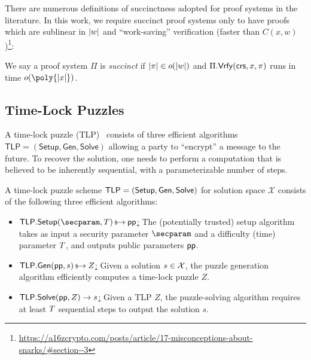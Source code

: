 There are numerous definitions of succinctness adopted for proof systems in the literature. In this work, we require succinct proof systems only to have proofs which are sublinear in $\lvert w \rvert$ and ``work-saving'' verification (faster than $C(x,w)$)\footnote{\url{https://a16zcrypto.com/posts/article/17-misconceptions-about-snarks/\#section--3}}:

\begin{definition}[succinct]
    We say a proof system $\Pi$ is \emph{succinct} if $\lvert \pi \rvert \in o(\lvert w \rvert)$ and $\Pi.\mathsf{Vrfy}(\mathsf{crs}, x, \pi)$ runs in time $o(\poly{\sizeof{x}})$.
\end{definition}


\subsection{Time-Lock Puzzles}\label{sec:tlp}

A time-lock puzzle (TLP)~\cite{RivShaWag96} consists of three efficient algorithms $\mathsf{TLP} = (\mathsf{Setup}, \mathsf{Gen}, \mathsf{Solve})$ allowing a party to ``encrypt'' a message to the future. To recover the solution, one needs to perform a computation that is believed to be inherently sequential, with a parameterizable number of steps.

\begin{definition} A time-lock puzzle scheme $\sf TLP = (\mathsf{Setup}, \mathsf{Gen}, \mathsf{Solve})$ for solution space $\mathcal{X}$ consists of the following three efficient algorithms:
    \begin{itemize}
        \item \underline{$\mathsf{TLP.Setup}(\secparam, \Ttime) \randout \pparam$:} The (potentially trusted) setup algorithm takes as input a security parameter $\secparam$ and a difficulty (time) parameter $T$, and outputs public parameters $\mathsf{pp}$. %
        \item \underline{$\mathsf{TLP.Gen}(\mathsf{pp}, s) \,{\mbox{\scriptsize${\$}$\normalsize}\!\!\to}\hskip2.3pt Z$:} Given a solution $s \in \mathcal{X}$, the puzzle generation algorithm efficiently computes a time-lock puzzle $Z$.
        \item \underline{$\mathsf{TLP.Solve}(\mathsf{pp}, Z) \rightarrow s$:} Given a TLP $Z$, the puzzle-solving algorithm requires at least $T$ sequential steps to output the solution $s$.
    \end{itemize}
\end{definition}

